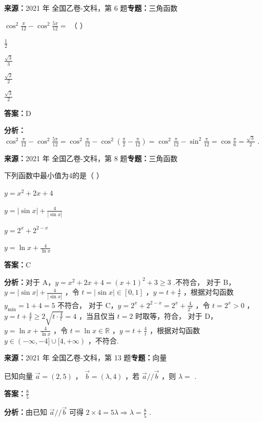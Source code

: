 \begin{question}[points=5]
\textbf{来源：}2021 年 全国乙卷-文科，第 6 题\quad \textbf{专题：}三角函数\par
$\cos^2\frac{\pi}{12} - \cos^2\frac{5\pi}{12} =$ （ ）
\begin{choices}
  \item $\frac{1}{2}$
  \item $\frac{\sqrt{3}}{3}$
  \item $\frac{\sqrt{2}}{2}$
  \item $\frac{\sqrt{3}}{2}$
\end{choices}
\begin{solution}
\textbf{答案：}D

\textbf{分析：}$\cos^2\frac{\pi}{12} - \cos^2\frac{5\pi}{12} = \cos^2\frac{\pi}{12} - \cos^2\left(\frac{\pi}{2} - \frac{\pi}{12}\right) = \cos^2\frac{\pi}{12} - \sin^2\frac{\pi}{12} = \cos\frac{\pi}{6} = \frac{\sqrt{3}}{2}$ .
\end{solution}
\end{question}

\begin{question}[points=5]
\textbf{来源：}2021 年 全国乙卷-文科，第 8 题\quad \textbf{专题：}三角函数\par
下列函数中最小值为4的是（ ）
\begin{choices}
  \item $y = x^2 + 2x + 4$
  \item $y = |\sin x| + \frac{4}{|\sin x|}$
  \item $y = 2^x + 2^{2-x}$
  \item $y = \ln x + \frac{4}{\ln x}$
\end{choices}
\begin{solution}
\textbf{答案：}C

\textbf{分析：}对于 A，$y = x^2 + 2x + 4 = (x+1)^2 + 3 \ge 3$ .不符合，
对于 B，$y = |\sin x| + \frac{4}{|\sin x|}$ ，令 $t = |\sin x| \in [0,1]$ ，$y = t + \frac{4}{t}$ ，根据对勾函数 $y_{\min} = 1 + 4 = 5$ 不符合，
对于 C，$y = 2^x + 2^{2-x} = 2^x + \frac{4}{2^x}$ ，令 $t = 2^x > 0$ ，$y = t + \frac{4}{t} \ge 2\sqrt{t \cdot \frac{4}{t}} = 4$ ，当且仅当 $t=2$ 时取等，符合，
对于 D，$y = \ln x + \frac{4}{\ln x}$ ，令 $t = \ln x \in \mathbb{R}$ ，$y = t + \frac{4}{t}$ ，根据对勾函数 $y \in (-\infty, -4] \cup [4, +\infty)$ ，不符合.
\end{solution}
\end{question}

\begin{question}[points=5]
\textbf{来源：}2021 年 全国乙卷-文科，第 13 题\quad \textbf{专题：}向量\par
已知向量 $\vec{a} = (2,5)$ ， $\vec{b} = (\lambda, 4)$ ，若 $\vec{a} // \vec{b}$ ，则 $\lambda =$ .
\fillin[{$\frac{8}{5}$}]
\begin{solution}
\textbf{答案：}$\frac{8}{5}$

\textbf{分析：}由已知 $\vec{a} // \vec{b}$ 可得 $2 \times 4 = 5\lambda \Rightarrow \lambda = \frac{8}{5}$ .
\end{solution}
\end{question}

